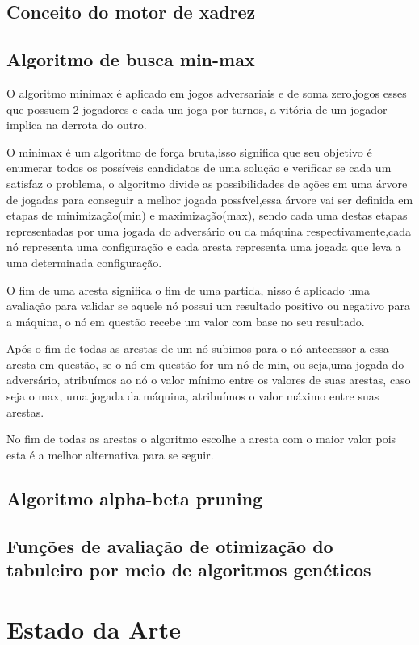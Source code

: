 \subsection{Conceito do motor de xadrez}

\subsection{Algoritmo de busca min-max}
O algoritmo minimax é aplicado em jogos adversariais e de soma zero,jogos esses que possuem 2 jogadores e cada um joga
por turnos, a vitória de um jogador implica na derrota do outro.

O minimax é um algoritmo de força bruta,isso significa que seu objetivo é enumerar todos os possíveis candidatos de uma
solução e verificar se cada um satisfaz o problema, o algoritmo divide as possibilidades de ações em uma árvore de jogadas
para conseguir a melhor jogada possível,essa árvore vai ser definida em etapas de minimização(min) e maximização(max),
sendo cada uma destas etapas representadas por uma jogada do adversário ou da máquina respectivamente,cada nó representa
uma configuração e cada aresta representa uma jogada que leva a uma determinada configuração.

O fim de uma aresta significa o fim de uma partida, nisso é aplicado uma avaliação para validar se aquele nó possui
um resultado positivo ou negativo para a máquina, o nó em questão recebe um valor com base no seu resultado.

Após o fim de todas as arestas de um nó subimos para o nó antecessor a essa aresta em questão, se o nó em questão for um nó
de min, ou seja,uma jogada do adversário, atribuímos ao nó o valor mínimo entre os valores de suas arestas, caso seja o max,
uma jogada da máquina, atribuímos o valor máximo entre suas arestas.

No fim de todas as arestas o algoritmo escolhe a aresta com o maior valor pois esta é a melhor alternativa para se seguir.

\subsection{Algoritmo alpha-beta pruning}

\subsection{Funções de avaliação de otimização do tabuleiro por meio de algoritmos genéticos}

\section{Estado da Arte}
